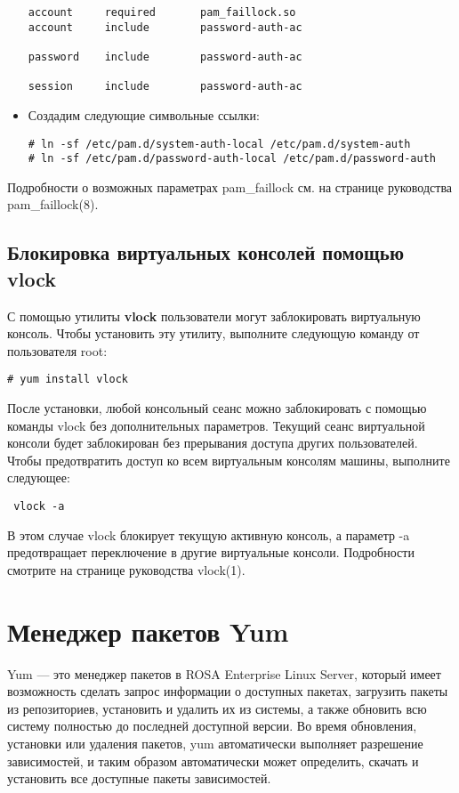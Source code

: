 \documentclass[a4paper,10pt,twoside]{article}
\begin{document}
\begin{itemize}
\begin{verbatim}
account     required       pam_faillock.so
account     include        password-auth-ac

password    include        password-auth-ac

session     include        password-auth-ac
\end{verbatim}
\item Создадим следующие символьные ссылки:
\begin{verbatim}
# ln -sf /etc/pam.d/system-auth-local /etc/pam.d/system-auth
# ln -sf /etc/pam.d/password-auth-local /etc/pam.d/password-auth
\end{verbatim} 
\end{itemize}


Подробности о возможных параметрах pam\_faillock см. на странице руководства pam\_faillock(8).


\subsection{Блокировка виртуальных консолей помощью vlock}
С помощью утилиты \textbf{vlock} пользователи могут заблокировать виртуальную консоль. Чтобы установить эту утилиту, выполните следующую команду от пользователя root:

\begin{verbatim}
# yum install vlock
\end{verbatim} 

После установки, любой консольный сеанс можно заблокировать с помощью команды vlock без дополнительных параметров. Текущий сеанс виртуальной консоли будет заблокирован без прерывания доступа других пользователей. Чтобы предотвратить доступ ко всем виртуальным консолям машины, выполните следующее:

\begin{verbatim}
 vlock -a
\end{verbatim} 

В этом случае vlock блокирует  текущую активную консоль, а параметр -a предотвращает переключение в другие виртуальные консоли. Подробности смотрите на странице руководства vlock(1).


\section{Менеджер пакетов Yum}
Yum — это менеджер пакетов в ROSA Enterprise Linux Server, который имеет возможность сделать запрос информации о доступных пакетах, загрузить пакеты из репозиториев, установить и удалить их из системы, а также обновить всю систему полностью до последней доступной версии. Во время обновления, установки или удаления пакетов, yum автоматически выполняет разрешение зависимостей, и таким образом автоматически может определить, скачать и установить все доступные пакеты зависимостей.
\end{document}

